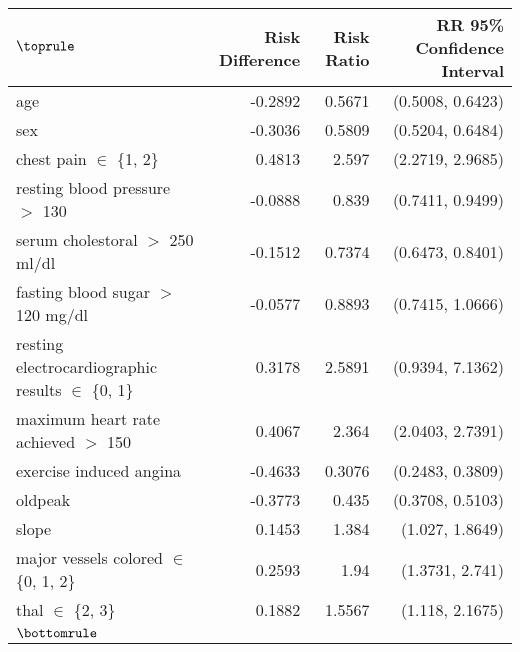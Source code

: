 \def\arraystretch{0.7}
\begin{tabular}{lrrr}
    $\toprule$
    {} & Risk Difference & Risk Ratio & RR 95\% Confidence Interval \\
    \midrule
    age                                           &         -0.2892 &     0.5671 &           (0.5008, 0.6423) \\
    sex                                           &         -0.3036 &     0.5809 &           (0.5204, 0.6484) \\
    chest pain $\in$ \{1, 2\}                           &          0.4813 &      2.597 &           (2.2719, 2.9685) \\
    resting blood pressure $>$ 130                  &         -0.0888 &      0.839 &           (0.7411, 0.9499) \\
    serum cholestoral $>$ 250 ml/dl                 &         -0.1512 &     0.7374 &           (0.6473, 0.8401) \\
    fasting blood sugar $>$ 120 mg/dl               &         -0.0577 &     0.8893 &           (0.7415, 1.0666) \\
    resting electrocardiographic results $\in$ \{0, 1\} &          0.3178 &     2.5891 &           (0.9394, 7.1362) \\
    maximum heart rate achieved $>$ 150             &          0.4067 &      2.364 &           (2.0403, 2.7391) \\
    exercise induced angina                       &         -0.4633 &     0.3076 &           (0.2483, 0.3809) \\
    oldpeak                                       &         -0.3773 &      0.435 &           (0.3708, 0.5103) \\
    slope                                         &          0.1453 &      1.384 &            (1.027, 1.8649) \\
    major vessels colored $\in$ \{0, 1, 2\}             &          0.2593 &       1.94 &            (1.3731, 2.741) \\
    thal $\in$ \{2, 3\}                                 &          0.1882 &     1.5567 &            (1.118, 2.1675) \\
    $\bottomrule$
\end{tabular}
